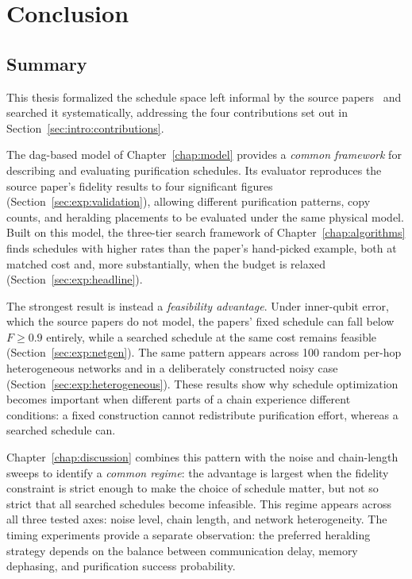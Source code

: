 \chapter{Conclusion}
\label{chap:conclusion}


\section{Summary}
\label{sec:conc:summary}


This thesis formalized the schedule space left informal by the source papers~\cite{Benchasattabuse2026Bridging,Benchasattabuse2025Integrating} and searched it systematically, addressing the four contributions set out in Section~\ref{sec:intro:contributions}.

The \Gls{dag}-based model of Chapter~\ref{chap:model} provides a \emph{common framework} for describing and evaluating purification schedules. Its evaluator reproduces the source paper's fidelity results to four significant figures (Section~\ref{sec:exp:validation}), allowing different purification patterns, copy counts, and heralding placements to be evaluated under the same physical model. Built on this model, the three-tier search framework of Chapter~\ref{chap:algorithms} finds schedules with higher rates than the paper's hand-picked example, both at matched cost and, more substantially, when the budget is relaxed (Section~\ref{sec:exp:headline}).

The strongest result is instead a \emph{feasibility advantage}. Under inner-qubit error, which the source papers do not model, the papers' fixed schedule can fall below $F\ge0.9$ entirely, while a searched schedule at the same cost remains feasible (Section~\ref{sec:exp:netgen}). The same pattern appears across 100 random per-hop heterogeneous networks and in a deliberately constructed noisy case (Section~\ref{sec:exp:heterogeneous}). These results show why schedule optimization becomes important when different parts of a chain experience different conditions: a fixed construction cannot redistribute purification effort, whereas a searched schedule can.

Chapter~\ref{chap:discussion} combines this pattern with the noise and chain-length sweeps to identify a \emph{common regime}: the advantage is largest when the fidelity constraint is strict enough to make the choice of schedule matter, but not so strict that all searched schedules become infeasible. This regime appears across all three tested axes: noise level, chain length, and network heterogeneity. The timing experiments provide a separate observation: the preferred heralding strategy depends on the balance between communication delay, memory dephasing, and purification success probability.

